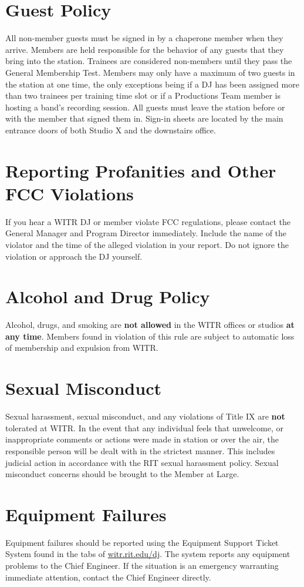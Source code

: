 \documentclass{witrman}
\begin{document}
\section{Guest Policy}
All non-member guests must be signed in by a chaperone member when they arrive.
Members are held responsible for the behavior of any guests that they bring into
the station. Trainees are considered non-members until they pass the General
Membership Test. Members may only have a maximum of two guests in the station at
one time, the only exceptions being if a DJ has been assigned more than two
trainees per training time slot or if a Productions Team member is hosting a
band’s recording session. All guests must leave the station before or with the
member that signed them in. Sign-in sheets are located by the main entrance
doors of both Studio X and the downstairs office.

\section{Reporting Profanities and Other FCC Violations}
If you hear a WITR DJ or member violate FCC regulations, please contact the
General Manager and Program Director immediately. Include the name of the
violator and the time of the alleged violation in your report. Do not ignore the
violation or approach the DJ yourself.

\section{Alcohol and Drug Policy}
Alcohol, drugs, and smoking are \textbf{not allowed} in the WITR offices or
studios \textbf{at any time}. Members found in violation of this rule are
subject to automatic loss of membership and expulsion from WITR\@.

\section{Sexual Misconduct}
Sexual harassment, sexual misconduct, and any violations of Title IX are
\textbf{not} tolerated at WITR\@. In the event that any individual feels that
unwelcome, or inappropriate comments or actions were made in station or over the
air, the responsible person will be dealt with in the strictest manner. This
includes judicial action in accordance with the RIT sexual harassment policy.
Sexual misconduct concerns should be brought to the Member at Large.

\section{Equipment Failures}
Equipment failures should be reported using the Equipment Support Ticket System
found in the tabs of \href{https://witr.rit.edu/dj/}{witr.rit.edu/dj}. The
system reports any equipment problems to the Chief Engineer. If the situation is
an emergency warranting immediate attention, contact the Chief Engineer
directly.
\end{document}
